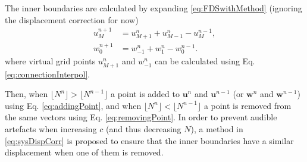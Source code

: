 The inner boundaries are calculated by expanding \eqref{eq:FDSwithMethod} (ignoring the displacement correction for now)
\begin{subequations}
    \begin{align}
        u_M^{n+1} &= u_{M+1}^n + u_{M-1}^n - u_M^{n-1},\\
        w_0^{n+1} &= w_{-1}^n + w_{1}^n - w_0^{n-1}.
    \end{align}
\end{subequations}
%
where virtual grid points $u_{M+1}^n$ and $w_{-1}^n$ can be calculated using Eq. \eqref{eq:connectionInterpol}.

Then, when $\lfloor N^n \rfloor > \lfloor N^{n-1} \rfloor$ a point is added to $\mathbf{u}^n$ and $\mathbf{u}^{n-1}$ (or $\mathbf{w}^n$ and $\mathbf{w}^{n-1}$) using Eq. \eqref{eq:addingPoint}, and when $\lfloor N^n \rfloor <\lfloor N^{n-1} \rfloor$ a point is removed from the same vectors using Eq. \eqref{eq:removingPoint}. In order to prevent audible artefacts when increasing $c$ (and thus decreasing $N$), a method in \eqref{eq:sysDispCorr} is proposed to ensure that the inner boundaries have a similar displacement when one of them is removed. 

